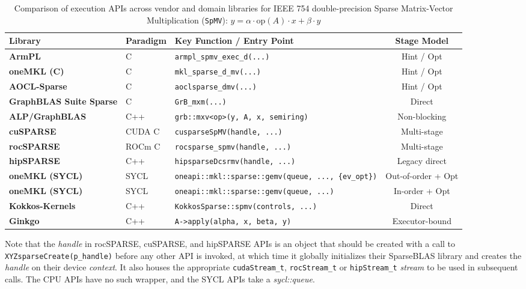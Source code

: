 \documentclass[manuscript,review]{acmart}
\begin{document}
\begin{table}[b]
  \centering
  \caption{Comparison of execution APIs across vendor and domain libraries for IEEE 754 double-precision Sparse Matrix-Vector Multiplication (\texttt{SpMV}): $y = \alpha\cdot\text{op}\left(A\right)\cdot x + \beta\cdot y $}
  \label{tab:spmv_api_comparison}
  \small
  \begin{tabularx}{\textwidth}{l l X c}
    \toprule
    \textbf{Library} & \textbf{Paradigm} & \textbf{Key Function / Entry Point} & \textbf{Stage Model} \\
    \midrule
    \textbf{ArmPL} & C & \texttt{armpl\_spmv\_exec\_d(...)} & Hint / Opt \\
    \textbf{oneMKL (C)} & C & \texttt{mkl\_sparse\_d\_mv(...)} & Hint / Opt \\
    \textbf{AOCL-Sparse} & C & \texttt{aoclsparse\_dmv(...)} & Hint / Opt \\
    \textbf{GraphBLAS Suite Sparse} & C & \texttt{GrB\_mxm(...)} & Direct \\
    \textbf{ALP/GraphBLAS} & C++ & \texttt{grb::mxv<op>(y, A, x, semiring)} & Non-blocking \\
    \textbf{cuSPARSE} & CUDA C & \texttt{cusparseSpMV(handle, ...)} & Multi-stage \\
    \textbf{rocSPARSE} & ROCm C & \texttt{rocsparse\_spmv(handle, ...)} & Multi-stage \\
    \textbf{hipSPARSE} & C++ & \texttt{hipsparseDcsrmv(handle, ...)} & Legacy direct \\
    \textbf{oneMKL (SYCL)} & SYCL & \texttt{oneapi::mkl::sparse::gemv(queue, ..., \{ev\_opt\})} & Out-of-order + Opt \\
    \textbf{oneMKL (SYCL)} & SYCL & \texttt{oneapi::mkl::sparse::gemv(queue, ...)} & In-order + Opt \\
    \textbf{Kokkos-Kernels} & C++ & \texttt{KokkosSparse::spmv(controls, ...)} & Direct \\
    \textbf{Ginkgo} & C++ & \texttt{A->apply(alpha, x, beta, y)} & Executor-bound \\
    \bottomrule
  \end{tabularx}
\end{table}



Note that the \textit{handle} in rocSPARSE, cuSPARSE, and hipSPARSE APIs is an object that should be created with a call to \verb|XYZsparseCreate(p_handle)| before any other API is invoked, at which time it globally initializes their SparseBLAS library and creates the \textit{handle} on their device \textit{context}. It also houses the appropriate \verb|cudaStream_t|, \verb|rocStream_t| or \verb|hipStream_t| \textit{stream} to be used in subsequent calls.  The CPU APIs have no such wrapper, and the SYCL APIs take a \textit{sycl::queue}.
\end{document}
